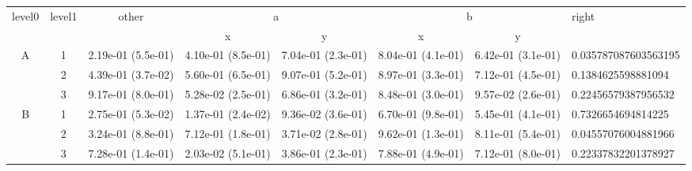 \begin{tabular}{cccccccl}
\toprule
\multirow{2}{*}{level0} & \multirow{2}{*}{level1}& \multirow{2}{*}{other}&\multicolumn{2}{c}{a}&\multicolumn{2}{c}{b}& \multirow{2}{*}{right}\tabularnewline
\cmidrule(lr){4-5}
\cmidrule(lr){6-7}
&&&x&y&x&y\tabularnewline
\midrule
\multirow{3}{*}{A}&1& 2.19e-01 (5.5e-01)& 4.10e-01 (8.5e-01)& 7.04e-01 (2.3e-01)& 8.04e-01 (4.1e-01)& 6.42e-01 (3.1e-01)& 0.035787087603563195\tabularnewline
&2& 4.39e-01 (3.7e-02)& 5.60e-01 (6.5e-01)& 9.07e-01 (5.2e-01)& 8.97e-01 (3.3e-01)& 7.12e-01 (4.5e-01)& 0.1384625598881094\tabularnewline
&3& 9.17e-01 (8.0e-01)& 5.28e-02 (2.5e-01)& 6.86e-01 (3.2e-01)& 8.48e-01 (3.0e-01)& 9.57e-02 (2.6e-01)& 0.22456579387956532\tabularnewline
\midrule
\multirow{3}{*}{B}&1& 2.75e-01 (5.3e-02)& 1.37e-01 (2.4e-02)& 9.36e-02 (3.6e-01)& 6.70e-01 (9.8e-01)& 5.45e-01 (4.1e-01)& 0.7326654694814225\tabularnewline
&2& 3.24e-01 (8.8e-01)& 7.12e-01 (1.8e-01)& 3.71e-02 (2.8e-01)& 9.62e-01 (1.3e-01)& 8.11e-01 (5.4e-01)& 0.04557076004881966\tabularnewline
&3& 7.28e-01 (1.4e-01)& 2.03e-02 (5.1e-01)& 3.86e-01 (2.3e-01)& 7.88e-01 (4.9e-01)& 7.12e-01 (8.0e-01)& 0.22337832201378927\tabularnewline
\bottomrule
\end{tabular}
